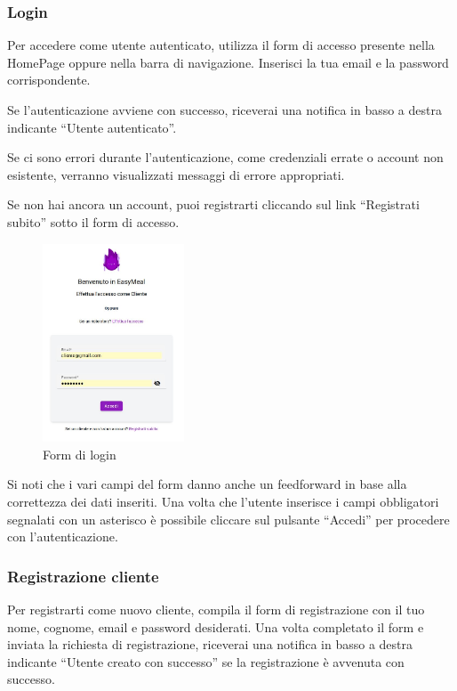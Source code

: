 \subsubsection{Login}
Per accedere come utente autenticato, utilizza il form di accesso presente nella HomePage oppure nella barra di navigazione. 
Inserisci la tua email e la password corrispondente.

Se l'autenticazione avviene con successo, riceverai una notifica in basso a destra indicante ``Utente autenticato''.

Se ci sono errori durante l'autenticazione, come credenziali errate o account non esistente, verranno visualizzati messaggi di errore appropriati.

Se non hai ancora un account, puoi registrarti cliccando sul link ``Registrati subito''  sotto il form di accesso.

\begin{figure}[htbp]
    \centering
    \includegraphics[width=0.375\textwidth]{./img/Login.jpg}
    \caption{Form di login}
\end{figure}

Si noti che i vari campi del form danno anche un feedforward in base alla correttezza dei dati inseriti. 
Una volta che l'utente inserisce i campi obbligatori segnalati con un asterisco è possibile cliccare sul pulsante ``Accedi'' per procedere con l'autenticazione.

\subsubsection{Registrazione cliente}
Per registrarti come nuovo cliente, compila il form di registrazione con il tuo nome, cognome, email e password desiderati. 
Una volta completato il form e inviata la richiesta di registrazione, riceverai una notifica in basso a destra indicante 
``Utente creato con successo'' se la registrazione è avvenuta con successo.

